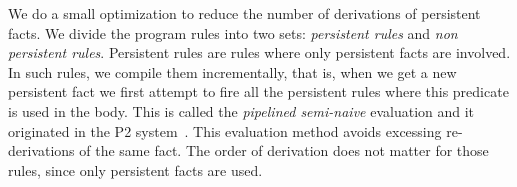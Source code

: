 We do a small optimization to reduce the number of derivations of persistent facts. We
divide the program rules into two sets: \emph{persistent rules} and \emph{non persistent rules}.
Persistent rules are rules where only persistent facts are involved. In such rules, we compile
them incrementally, that is, when we get a new persistent fact we first attempt to fire
all the persistent rules where this predicate is used in the body. This is called
the \emph{pipelined semi-naive} evaluation and it originated in the P2 system~\cite{Loo-condie-garofalakis-p2}. This evaluation method avoids excessing re-derivations
of the same fact. The order of derivation does not matter for those rules, since
only persistent facts are used.